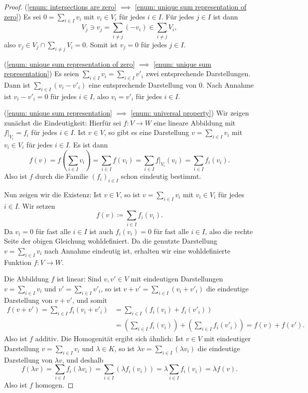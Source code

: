 \documentclass[a4paper,10pt]{scrartcl}
\begin{document}
\begin{proof}

  (\ref{enum: intersections are zero} $\implies$ \ref{enum: unique sum representation of zero})
  Es sei $0 = \sum_{i \in I} v_i$ mit $v_i \in V_i$ für jedes $i \in I$.
  Für jedes $j \in I$ ist dann
  \[
        V_j
    \ni v_j
    =   \sum_{i \neq j} (-v_i)
    \in \sum_{i \neq j} V_i,
  \]
  also $v_j \in V_j \cap \sum_{i \neq j} V_i = 0$.
  Somit ist $v_j = 0$ für jedes $j \in I$.

  (\ref{enum: unique sum representation of zero} $\implies$ \ref{enum: unique sum representation})
  Es seien $\sum_{i \in I} v_i = \sum_{i \in I} v'_i$ zwei entsprechende Darstellungen.
  Dann ist $\sum_{i \in I} (v_i - v'_i)$ eine entsprechende Darstellung von $0$.
  Nach Annahme ist $v_i - v'_i = 0$ für jedes $i \in I$, also $v_i = v'_i$ für jedes $i \in I$.
  
  (\ref{enum: unique sum representation} $\implies$ \ref{enum: universal property})
  Wir zeigen zunächst die Eindeutigkeit:
  Hierfür sei $f \colon V \to W$ eine lineare Abbildung mit $f|_{V_i} = f_i$ für jedes $i \in I$.
  Ist $v \in V$, so gibt es eine Darstellung $v = \sum_{i \in I} v_i$ mit $v_i \in V_i$ für jedes $i \in I$.
  Es ist dann
  \[
      f(v)
    = f\left( \sum_{i \in I} v_i \right)
    = \sum_{i \in I} f(v_i)
    = \sum_{i \in I} f|_{V_i}(v_i)
    = \sum_{i \in I} f_i(v_i).
  \]
  Also ist $f$ durch die Familie $(f_i)_{i \in I}$ schon eindeutig bestimmt.
  
  Nun zeigen wir die Existenz:
  Ist $v \in V$, so ist $v = \sum_{i \in I} v_i$ mit $v_i \in V_i$ für jedes $i \in I$.
  Wir setzen
  \[
    f(v) \coloneqq \sum_{i \in I} f_i(v_i).
  \]
  Da $v_i = 0$ für fast alle $i \in I$ ist auch $f_i(v_i) = 0$ für fast alle $i \in I$, also die rechte Seite der obigen Gleichung wohldefiniert.
  Da die genutzte Darstellung $v = \sum_{i \in I} v_i$ nach Annahme eindeutig ist, erhalten wir eine wohldefinierte Funktion $f \colon V \to W$.
  
  Die Abbildung $f$ ist linear:
  Sind $v, v' \in V$ mit eindeutigen Darstellungen $v = \sum_{i \in I} v_i$ und $v' = \sum_{i \in I} v'_i$, so ist $v + v' = \sum_{i \in I} (v_i + v'_i)$ die eindeutige Darstellung von $v + v'$, und somit
  \begin{align*}
        f(v + v')
     =  \sum_{i \in I} f_i(v_i + v'_i)
    &=  \sum_{i \in I} ( f_i(v_i) + f_i(v'_i) ) \\
    &=  \left( \sum_{i \in I} f_i(v_i) \right) + \left( \sum_{i \in I} f_i(v'_i) \right)
     =  f(v) + f(v').
  \end{align*}
  Also ist $f$ additiv.
  Die Homogenität ergibt sich ähnlich:
  Ist $v \in V$ mit eindeutiger Darstellung $v = \sum_{i \in I} v_i$ und $\lambda \in K$, so ist $\lambda v = \sum_{i \in I} (\lambda v_i)$ die eindeutige Darstellung von $\lambda v$, und deshalb
  \[
      f(\lambda v)
    = \sum_{i \in I} f_i(\lambda v_i)
    = \sum_{i \in I} ( \lambda f_i(v_i) )
    = \lambda \sum_{i \in I} f_i(v_i)
    = \lambda f(v).
  \]
  Also ist $f$ homogen.
  

\end{proof}
\end{document}
